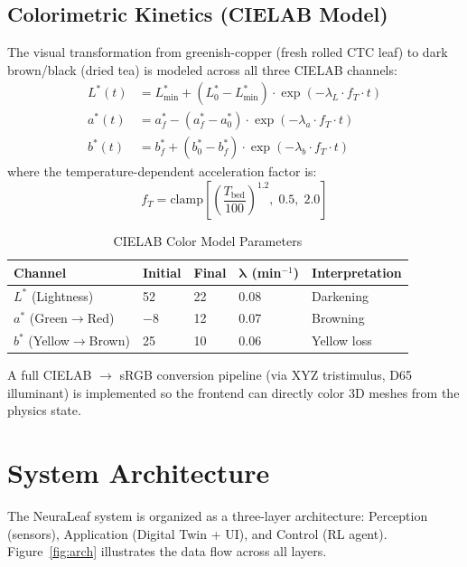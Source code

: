 ﻿\documentclass[12pt, a4paper]{report}
\begin{document}
\section{Colorimetric Kinetics (CIELAB Model)}
The visual transformation from greenish-copper (fresh rolled CTC leaf) to dark brown/black (dried tea) is modeled across all three CIELAB channels:
\begin{align}
L^*(t) &= L^*_{\min} + (L^*_0 - L^*_{\min}) \cdot \exp(-\lambda_L \cdot f_T \cdot t) \label{eq:lstar} \\
a^*(t) &= a^*_f - (a^*_f - a^*_0) \cdot \exp(-\lambda_a \cdot f_T \cdot t) \\
b^*(t) &= b^*_f + (b^*_0 - b^*_f) \cdot \exp(-\lambda_b \cdot f_T \cdot t)
\end{align}
where the temperature-dependent acceleration factor is:
\begin{equation}
f_T = \text{clamp}\!\left[\left(\frac{T_{\text{bed}}}{100}\right)^{1.2},\; 0.5,\; 2.0\right]
\end{equation}

\begin{table}[H]
\centering
\caption{CIELAB Color Model Parameters}
\label{tab:cielab_params}
\begin{tabular}{@{}lllll@{}}
\toprule
\textbf{Channel} & \textbf{Initial} & \textbf{Final} & $\boldsymbol{\lambda}$ \textbf{(min$^{-1}$)} & \textbf{Interpretation} \\
\midrule
$L^*$ (Lightness)   & 52  & 22  & 0.08 & Darkening \\
$a^*$ (Green$\to$Red) & $-8$ & 12  & 0.07 & Browning \\
$b^*$ (Yellow$\to$Brown) & 25  & 10  & 0.06 & Yellow loss \\
\bottomrule
\end{tabular}
\end{table}

\noindent A full CIELAB $\to$ sRGB conversion pipeline (via XYZ tristimulus, D65 illuminant) is implemented so the frontend can directly color 3D meshes from the physics state.


\chapter{System Architecture}

The NeuraLeaf system is organized as a three-layer architecture: Perception (sensors), Application (Digital Twin + UI), and Control (RL agent). Figure~\ref{fig:arch} illustrates the data flow across all layers.
\end{document}
